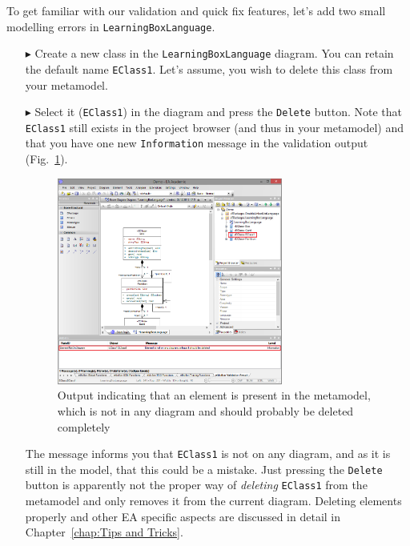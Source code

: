 To get familiar with our validation and quick fix features, let's add two small modelling errors in \texttt{LearningBoxLanguage}.

\begin{enumerate}
\item[$\blacktriangleright$] Create a new class in the \texttt{Learning\-Box\-Language} diagram.
You can retain the default name \texttt{EClass1}.
Let's assume, you wish to delete this class from your metamodel.
\item[$\blacktriangleright$] Select it (\texttt{EClass1}) in the diagram and press the \texttt{Delete} button.
Note that \texttt{EClass1} still exists in the project browser (and thus in your metamodel) and that you have one new \texttt{Information} message in the validation output (Fig.~\ref{fig:validation_information}).

\begin{figure}[htbp]
	\centering
  \includegraphics[width=0.7\textwidth]{pics/memBoxBilder/memBox43}
	\caption{Output indicating that an element is present in the metamodel, which is not in any diagram and should probably be deleted completely}
	\label{fig:validation_information}
\end{figure}

The message informs you that \texttt{EClass1} is not on any diagram, and as it is still in the model, that this could be a mistake.
Just pressing the \texttt{Delete} button is apparently not the proper way of \emph{deleting} \texttt{EClass1} from the metamodel and only removes it from the current diagram.
Deleting elements properly and other EA specific aspects are discussed in detail in Chapter~\ref{chap:Tips and Tricks}.



\end{enumerate}
